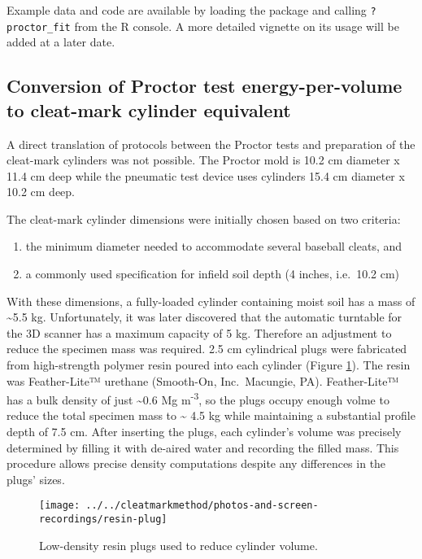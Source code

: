 \documentclass[
  letterpaper,
  openany]{book}
\begin{document}
Example data and code are available by loading the package and calling \texttt{?proctor\_fit} from the R console.
A more detailed vignette on its usage will be added at a later date.

\hypertarget{cleat-mark-energy-per-vol-conversion}{%
\subsection{Conversion of Proctor test energy-per-volume to cleat-mark cylinder equivalent}\label{cleat-mark-energy-per-vol-conversion}}

A direct translation of protocols between the Proctor tests and preparation of the cleat-mark cylinders was not possible.
The Proctor mold is 10.2 cm diameter x 11.4 cm deep while the pneumatic test device uses cylinders 15.4 cm diameter x 10.2 cm deep.

The cleat-mark cylinder dimensions were initially chosen based on two criteria:

\begin{enumerate}
\def\labelenumi{(\arabic{enumi})}
\item
  the minimum diameter needed to accommodate several baseball cleats, and
\item
  a commonly used specification for infield soil depth (4 inches, i.e.~10.2 cm)
\end{enumerate}

With these dimensions, a fully-loaded cylinder containing moist soil has a mass of \textasciitilde5.5 kg.
Unfortunately, it was later discovered that the automatic turntable for the 3D scanner has a maximum capacity of 5 kg.
Therefore an adjustment to reduce the specimen mass was required.
2.5 cm cylindrical plugs were fabricated from high-strength polymer resin poured into each cylinder (Figure \ref{fig:resin-plugs}).
The resin was Feather-Lite™ urethane (Smooth-On, Inc.~Macungie, PA).
Feather-Lite™ has a bulk density of just \textasciitilde0.6 Mg m\textsuperscript{-3}, so the plugs occupy enough volme to reduce the total specimen mass to \textasciitilde{} 4.5 kg while maintaining a substantial profile depth of 7.5 cm.
After inserting the plugs, each cylinder's volume was precisely determined by filling it with de-aired water and recording the filled mass.
This procedure allows precise density computations despite any differences in the plugs' sizes.

\begin{figure}

{\centering \texttt{[image: ../../cleatmarkmethod/photos-and-screen-recordings/resin-plug]} 

}

\caption{Low-density resin plugs used to reduce cylinder volume.}\label{fig:resin-plugs}
\end{figure}
\end{document}
